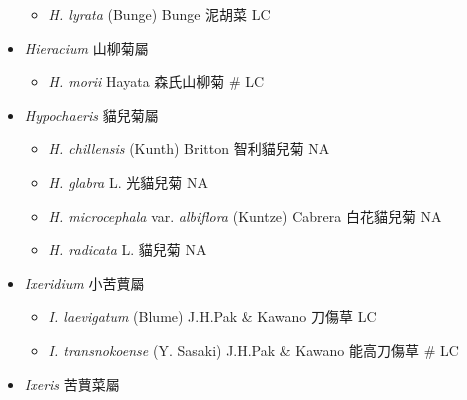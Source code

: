 \begin{itemize}
  \begin{itemize}
        \item[] \textit{H. lyrata} (Bunge) Bunge  泥胡菜   LC
  \end{itemize}
 \item[] \textit{Hieracium} 山柳菊屬
                                
  \begin{itemize}
        \item[] \textit{H. morii} Hayata  森氏山柳菊  \# LC
  \end{itemize}
 \item[] \textit{Hypochaeris} 貓兒菊屬
                                
  \begin{itemize}
        \item[] \textit{H. chillensis} (Kunth) Britton  智利貓兒菊   NA
        \item[] \textit{H. glabra} L.  光貓兒菊   NA
        \item[] \textit{H. microcephala} var. \textit{albiflora} (Kuntze) Cabrera  白花貓兒菊   NA
        \item[] \textit{H. radicata} L.  貓兒菊   NA
  \end{itemize}
 \item[] \textit{Ixeridium} 小苦蕒屬
                                
  \begin{itemize}
        \item[] \textit{I. laevigatum} (Blume) J.H.Pak \& Kawano  刀傷草   LC
        \item[] \textit{I. transnokoense} (Y. Sasaki) J.H.Pak \& Kawano  能高刀傷草  \# LC
  \end{itemize}
 \item[] \textit{Ixeris} 苦蕒菜屬
                                

\end{itemize}
